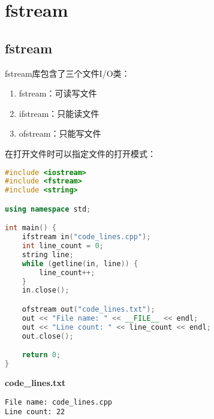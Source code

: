 \newpage

\section{fstream}

\subsection{fstream}

fstream库包含了三个文件I/O类：

\begin{enumerate}
    \item fstream：可读写文件
    \item ifstream：只能读文件
    \item ofstream：只能写文件
\end{enumerate}

在打开文件时可以指定文件的打开模式：\\

\begin{table}[H]
    \centering
    \caption{打开模式}
\end{table}

\vspace{0.5cm}


\begin{lstlisting}[language=C++]
#include <iostream>
#include <fstream>
#include <string>

using namespace std;

int main() {
    ifstream in("code_lines.cpp");
    int line_count = 0;
    string line;
    while (getline(in, line)) {
        line_count++;
    }
    in.close();

    ofstream out("code_lines.txt");
    out << "File name: " << __FILE__ << endl;
    out << "Line count: " << line_count << endl;
    out.close();

    return 0;
}
\end{lstlisting}

\begin{tcolorbox}
    \textbf{code\_lines.txt}
    \begin{verbatim}
File name: code_lines.cpp
Line count: 22
	\end{verbatim}
\end{tcolorbox}

\newpage
